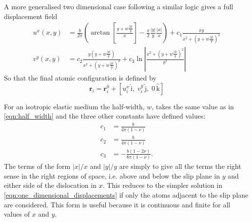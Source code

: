 A more generalised two dimensional case following a similar logic gives a full displacement field \cite{Eshelby1949,Leibfried1949,nabarro1987theory}
\begin{subequations}\label{eqn:displacements}
\begin{align}
u^x(x,y) &= \frac{b}{2\pi} \left( \arctan \left[ \frac{y +  w\frac{|y|}{y}}{x} \right] - \frac{\pi}{2} \frac{|y|}{y} \frac{|x|}{x} \right) + c_1 \frac{xy}{x^{2} + (y + w\frac{|y|}{y} )^2} \\
v^y(x,y) &= c_2 \frac{y(y +  w \frac{|y|}{y})}{x^2 + (y +  w \frac{|y|}{y})^2} + c_3 \ln \left| \frac{x^2 + (y +  w \frac{|y|}{y})^2}{b^2} \right|
\end{align}
\label{eqn:displacement_field}
\end{subequations}
So that the final atomic configuration is defined by 
\begin{equation}
\bm{r}_i = \bm{r}_i^0 + [u_i^x\,\bm{\mathrm{\hat{i}}},\; v_i^y\,\bm{\mathrm{\hat{j}}},\; 0\,\bm{\mathrm{\hat{k}}}]
\end{equation}



For an isotropic elastic medium the half-width, $w$, takes the same value as in \autoref{eqn:half_width} and the three other constants have defined values:
\begin{subequations}\label{eqn:disloc_params}
\begin{align}
c_1 &= \frac{b}{4\pi{}(1-\nu)} \\
c_2 &= \frac{b}{4\pi{}(1-\nu)} \\
c_3 &= - \frac{b(1-2\nu)}{8\pi(1-\nu)}.
\end{align}
\label{eqn:expressions_for_the_ideal_disloca_parameters}
\end{subequations}
The terms of the form $|x|/x$ and $|y|/y$ are simply to give all the terms the right sense in the right regions of space, i.e. above and below the slip plane in $y$ and either side of the dislocation in $x$. This reduces to the simpler solution in \autoref{eqn:one_dimensional_displacements} if only the atoms adjacent to the slip plane are considered. This form is useful because it is continuous and finite for all values of $x$ and $y$. 



